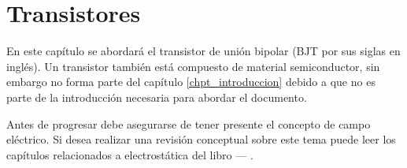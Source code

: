 \chapter{Transistores}

En este capítulo se abordará el transistor de unión bipolar (BJT por sus siglas en inglés). Un transistor también está compuesto de material semiconductor, sin embargo no forma parte del capítulo \ref{chpt_introduccion} debido a que no es parte de la introducción necesaria para abordar el documento. 

Antes de progresar debe asegurarse de tener presente el concepto de campo eléctrico. Si desea realizar una revisión conceptual sobre este tema puede leer los capítulos relacionados a electrostática del libro  --- \cite{f2elio}.












